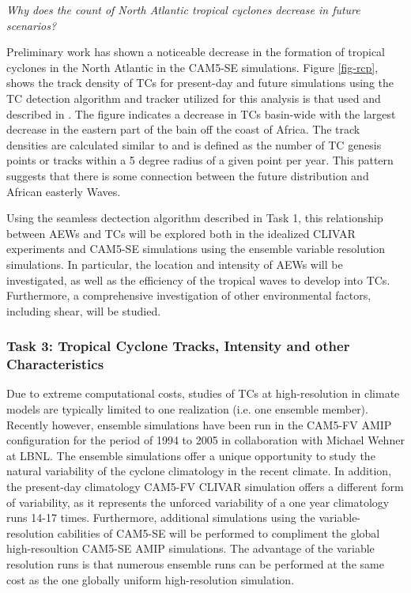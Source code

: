 \documentclass[11pt]{article}
\begin{document}

\emph{Why does the count of North Atlantic tropical cyclones decrease in future scenarios?}

Preliminary work has shown a noticeable decrease in the formation of tropical cyclones in the North Atlantic in the CAM5-SE simulations. Figure \ref{fig-rcp}, shows the track density of TCs for present-day and future simulations using the TC detection algorithm and tracker utilized for this analysis is that used and described in \citet{Zhao2009}. The figure indicates a decrease in TCs basin-wide with the largest decrease in the eastern part of the bain off the coast of Africa. The track densities are calculated similar to \citet{Done2013} and is defined as the number of TC genesis points or tracks within a 5 degree radius of a given point per year. This pattern suggests that there is some connection between the future distribution and African easterly Waves.

Using the seamless dectection algorithm described in Task 1, this relationship between AEWs and TCs will be explored both in the idealized CLIVAR experiments and CAM5-SE simulations using the ensemble variable resolution simulations. In particular, the location and intensity of AEWs will be investigated, as well as the efficiency of the tropical waves to develop into TCs. Furthermore, a comprehensive investigation of other environmental factors, including shear, will be studied.

\subsubsection{Task 3: Tropical Cyclone Tracks, Intensity and other Characteristics}

Due to extreme computational costs, studies of TCs at high-resolution in climate models are typically limited to one realization (i.e. one ensemble member). Recently however, ensemble simulations have been run in the CAM5-FV AMIP configuration for the period of 1994 to 2005 in collaboration with Michael Wehner at LBNL. The ensemble simulations offer a unique opportunity to study the natural variability of the cyclone climatology in the recent climate. In addition, the present-day climatology CAM5-FV CLIVAR simulation offers a different form of variability, as it represents the unforced variability of a one year climatology runs 14-17 times. Furthermore, additional simulations using the variable-resolution cabilities of CAM5-SE will be performed to compliment the global high-resoultion CAM5-SE AMIP simulations. The advantage of the variable resolution runs is that numerous ensemble runs can be performed at the same cost as the one globally uniform high-resolution simulation.
\end{document}
